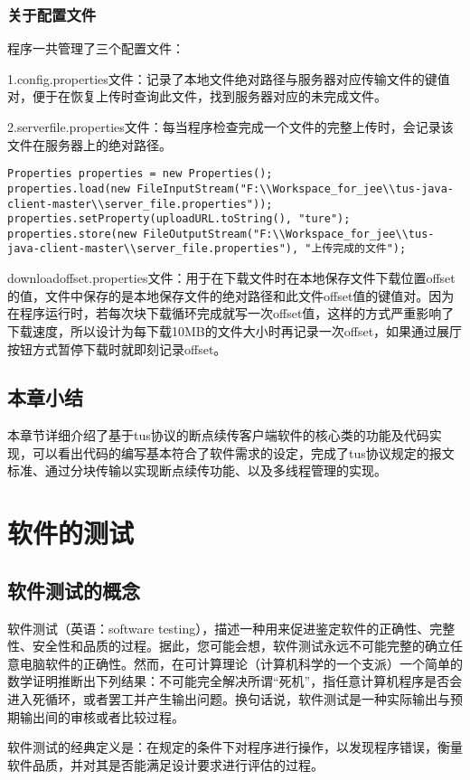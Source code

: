 \documentclass[bachelor]{thesis-uestc}
\begin{document}
\subsection{关于配置文件}
程序一共管理了三个配置文件：
\par 1.config.properties文件：记录了本地文件绝对路径与服务器对应传输文件的键值对，便于在恢复上传时查询此文件，找到服务器对应的未完成文件。
\par 2.serverfile.properties文件：每当程序检查完成一个文件的完整上传时，会记录该文件在服务器上的绝对路径。
\begin{lstlisting}[title=记录服务器中存在的完整文件]
Properties properties = new Properties();
properties.load(new FileInputStream("F:\\Workspace_for_jee\\tus-java-client-master\\server_file.properties"));
properties.setProperty(uploadURL.toString(), "ture");
properties.store(new FileOutputStream("F:\\Workspace_for_jee\\tus-java-client-master\\server_file.properties"), "上传完成的文件");
\end{lstlisting}
\par downloadoffset.properties文件：用于在下载文件时在本地保存文件下载位置offset的值，文件中保存的是本地保存文件的绝对路径和此文件offset值的键值对。因为在程序运行时，若每次块下载循环完成就写一次offset值，这样的方式严重影响了下载速度，所以设计为每下载10MB的文件大小时再记录一次offset，如果通过展厅按钮方式暂停下载时就即刻记录offset。

\section{本章小结}
本章节详细介绍了基于tus协议的断点续传客户端软件的核心类的功能及代码实现，可以看出代码的编写基本符合了软件需求的设定，完成了tus协议规定的报文标准、通过分块传输以实现断点续传功能、以及多线程管理的实现。

\chapter{软件的测试}
\section{软件测试的概念}
软件测试（英语：software testing），描述一种用来促进鉴定软件的正确性、完整性、安全性和品质的过程。据此，您可能会想，软件测试永远不可能完整的确立任意电脑软件的正确性。然而，在可计算理论（计算机科学的一个支派）一个简单的数学证明推断出下列结果：不可能完全解决所谓“死机”，指任意计算机程序是否会进入死循环，或者罢工并产生输出问题。换句话说，软件测试是一种实际输出与预期输出间的审核或者比较过程。
\par 软件测试的经典定义是：在规定的条件下对程序进行操作，以发现程序错误，衡量软件品质，并对其是否能满足设计要求进行评估的过程。
\end{document}
